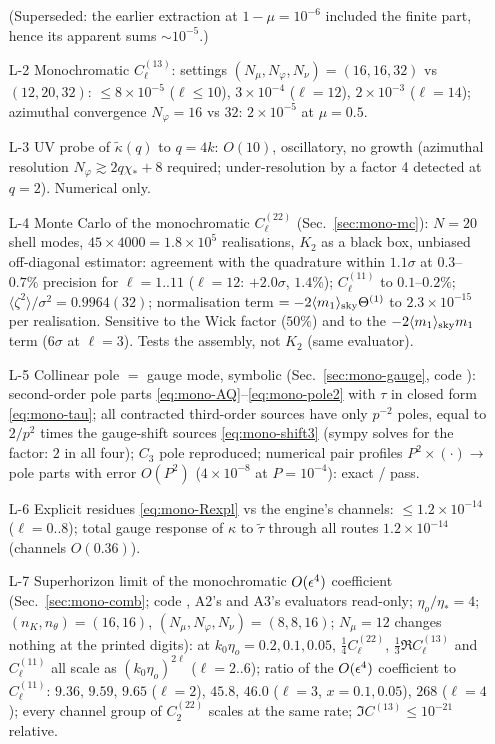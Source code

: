 \begin{itemize}
(Superseded: the earlier extraction at $1-\mu=10^{-6}$ included the finite part, hence its apparent sums $\sim10^{-5}$.)
\item[L-2] Monochromatic $C^{(13)}_\ell$: settings $(N_\mu,N_\varphi,N_\nu)=(16,16,32)$ vs $(12,20,32)$: $\le8\times10^{-5}$ ($\ell\le10$), $3\times10^{-4}$ ($\ell=12$),
$2\times10^{-3}$ ($\ell=14$); azimuthal convergence $N_\varphi=16$ vs $32$: $2\times10^{-5}$ at $\mu=0.5$.
\item[L-3] UV probe of $\tilde\kappa(q)$ to $q=4k$: $O(10)$, oscillatory, no growth (azimuthal resolution $N_\varphi\gtrsim2q\chi_*+8$ required; under-resolution
by a factor 4 detected at $q=2$).  Numerical only.
\item[L-4] Monte Carlo of the monochromatic $C^{(22)}_\ell$ (Sec.~\ref{sec:mono-mc}): $N=20$ shell modes, $45\times4000=1.8\times10^5$ realisations,
$K_2$ as a black box, unbiased off-diagonal estimator: agreement with the quadrature within $1.1\sigma$ at $0.3$--$0.7\%$ precision for $\ell=1..11$
($\ell=12$: $+2.0\sigma$, $1.4\%$); $C^{(11)}_\ell$ to $0.1$--$0.2\%$; $\langle\zeta^2\rangle/\sigma^2=0.9964(32)$; normalisation term $=-2\langle m_1\rangle_{\rm sky}\Theta^{(1)}$ to
$2.3\times10^{-15}$ per realisation.  Sensitive to the Wick factor ($50\%$) and to the $-2\langle m_1\rangle_{\rm sky}m_1$ term ($6\sigma$ at $\ell=3$).  Tests the
assembly, not $K_2$ (same evaluator).
\item[L-5] Collinear pole $=$ gauge mode, symbolic (Sec.~\ref{sec:mono-gauge}, code ): second-order pole parts \eqref{eq:mono-AQ}--\eqref{eq:mono-pole2}
with $\tau$ in closed form \eqref{eq:mono-tau}; all contracted third-order sources have only $p^{-2}$ poles, equal to $2/p^2$ times the gauge-shift sources
\eqref{eq:mono-shift3} (sympy solves for the factor: $2$ in all four); $C_3$ pole reproduced; numerical pair profiles $P^2\times(\cdot)\to$ pole parts with error $O(P^2)$
($4\times10^{-8}$ at $P=10^{-4}$): exact / pass.
\item[L-6] Explicit residues \eqref{eq:mono-Rexpl} vs the engine's channels: $\le1.2\times10^{-14}$ ($\ell=0..8$); total gauge response of $\kappa$ to $\tilde\tau$ through all
routes $1.2\times10^{-14}$ (channels $O(0.36)$).
\item[L-7] Superhorizon limit of the monochromatic $O(\epsilon^4)$ coefficient (Sec.~\ref{sec:mono-comb}; code , A2's and A3's
evaluators read-only; $\eta_o/\eta_*=4$; $(n_K,n_\theta)=(16,16)$, $(N_\mu,N_\varphi,N_\nu)=(8,8,16)$; $N_\mu=12$ changes nothing at the printed digits):
at $k_0\eta_o=0.2,0.1,0.05$, $\tfrac14C^{(22)}_\ell$, $\tfrac13\Re C^{(13)}_\ell$ and $C^{(11)}_\ell$ all scale as $(k_0\eta_o)^{2\ell}$ ($\ell=2..6$); ratio of the
$O(\epsilon^4)$ coefficient to $C^{(11)}_\ell$: $9.36,\,9.59,\,9.65$ ($\ell=2$), $45.8,\,46.0$ ($\ell=3$, $x=0.1,0.05$), $268$ ($\ell=4$); every channel group of
$C^{(22)}_2$ scales at the same rate; $\Im C^{(13)}\le10^{-21}$ relative.
\end{itemize}

